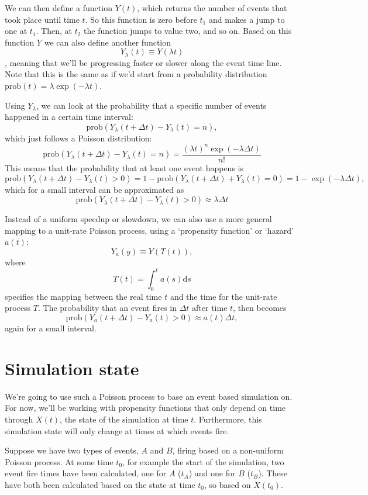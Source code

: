 \documentclass[a4paper,11pt]{article}
\newcommand{\ud}{\mathrm{d}}
\newcommand{\mcm}{\mathrm{,}}
\newcommand{\prob}{\mathrm{prob}}
\begin{document}
		We can then define a function $Y(t)$, which returns the number of events that took place until time
		$t$. So this function is zero before $t_1$ and makes a jump to one at $t_1$. Then, at $t_2$ the
		function jumps to value two, and so on. Based on this function $Y$ we can also define another
		function
		\[ Y_\lambda(t) \equiv Y(\lambda t) \],
		meaning that we'll be progressing faster or slower along the event time line. Note that this is the
		same as if we'd start from a probability distribution $\prob(t) = \lambda\exp(-\lambda t)$.

		Using $Y_\lambda$, we can look at the probability that a specific number of events happened in
		a certain time interval:
		\[ \prob(Y_\lambda(t+\Delta t) - Y_\lambda(t) = n) \mcm \]
		which just follows a Poisson distribution:
		\[ \prob(Y_\lambda(t+\Delta t) - Y_\lambda(t) = n) = \frac{(\lambda t)^n\exp(-\lambda \Delta t)}{n!} \]
		This means that the probability that at least one event happens is
		\[ \prob(Y_\lambda(t+\Delta t) - Y_\lambda(t) > 0) = 1 -  \prob(Y_\lambda(t+\Delta t) + Y_\lambda(t) = 0)
		                                                   = 1 - \exp(-\lambda \Delta t) \mcm \]
		which for a small interval can be approximated as
		\[ \prob(Y_\lambda(t+\Delta t) - Y_\lambda(t) > 0) \approx \lambda \Delta t \]
													
		Instead of a uniform speedup or slowdown, we can also use a more general mapping to a unit-rate
		Poisson process, using a `propensity function' or `hazard' $a(t)$:
		\[ Y_a(y) \equiv Y(T(t)) \mcm \]
		where
		\[ T(t) = \int_0^t a(s) \ud s \]
		specifies the mapping between the real time $t$ and the time for the unit-rate process $T$. The
		probability that an event fires in $\Delta t$ after time $t$, then becomes
		\[ \prob(Y_a(t+\Delta t) - Y_a(t) > 0) \approx a(t) \Delta t \mcm \]
		again for a small interval.

	\section{Simulation state}

		We're going to use such a Poisson process to base an event based simulation on. For now, we'll
		be working with propensity functions that only depend on time through $X(t)$, the state of the
		simulation at time $t$. Furthermore, this simulation state will only change at times at which
		events fire.

		Suppose we have two types of events, $A$ and $B$, firing based on a non-uniform Poisson process.
		At some time $t_0$, for example the start of the simulation, two event fire times have been calculated,
		one for $A$ ($t_A$) and one for $B$ ($t_B$). These have both been calculated based on the
		state at time $t_0$, so based on $X(t_0)$. 
		
\end{document}
